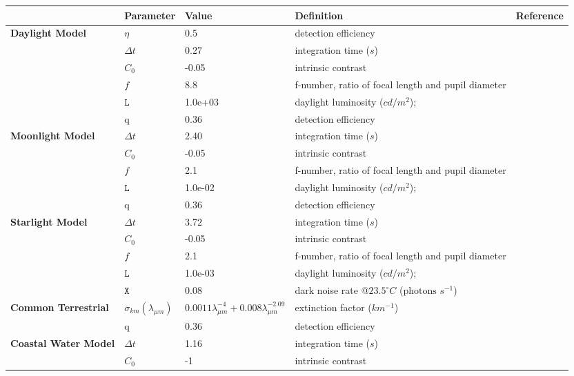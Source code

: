 \begin{tabular}{|L{3.5cm}|L{2.5cm}|L{2.5cm}|L{4.5cm}|L{4.5cm}|}
\hline
\textbf{ }&\textbf{Parameter}&\textbf{Value}&\textbf{Definition}&\textbf{Reference}\\\hline
\textbf{Daylight Model}&$\eta$&0.5&detection efficiency&\cite{Pirh07a}\\\hline
 &$\Delta t$&0.27&integration time ($s$)&\cite{Donn95a}\\\hline
 &$C_{0}$&-0.05&intrinsic contrast&\cite{Blac46a}\\\hline
 &$f$&8.8&f-number, ratio of focal length and pupil diameter&\cite{Mill79a}\\\hline
 &$\mathtt{L}$&1.0e+03&daylight luminosity ($cd/m^{2}$);&\cite{Midd52a}\\\hline
 &q&0.36&detection efficiency&\cite{Nils14a}\\\hline
\textbf{Moonlight Model}&$\Delta t$&2.40&integration time ($s$)&\cite{Donn95a}\\\hline
 &$C_{0}$&-0.05&intrinsic contrast&\cite{Blac46a}\\\hline
 &$f$&2.1&f-number, ratio of focal length and pupil diameter&\cite{Mill79a}\\\hline
 &$\mathtt{L}$&1.0e-02&daylight luminosity ($cd/m^{2}$);&\cite{Midd52a}\\\hline
 &q&0.36&detection efficiency&\cite{Nils14a}\\\hline
\textbf{Starlight Model}&$\Delta t$&3.72&integration time ($s$)&\cite{Donn95a}\\\hline
 &$C_{0}$&-0.05&intrinsic contrast&\cite{Blac46a}\\\hline
 &$f$&2.1&f-number, ratio of focal length and pupil diameter&\cite{Mill79a}\\\hline
 &$\mathtt{L}$&1.0e-03&daylight luminosity ($cd/m^{2}$);&\cite{Midd52a}\\\hline
 &$\mathtt{X}$&0.08&dark noise rate @$23.5^{\circ} C$ ($\text{photons } s^{-1}$)&\cite{Aho93a}\\\hline
\textbf{Common Terrestrial}&$\sigma_{km} (\lambda_{\mu m})$&$0.0011 \lambda_{\mu m}^{-4} + 0.008 \lambda_{\mu m}^{-2.09}$&extinction factor ($km^{-1}$)&\cite{Midd52a}\\\hline
 &q&0.36&detection efficiency&\cite{Nils14a}\\\hline
\textbf{Coastal Water Model}&$\Delta t$&1.16&integration time ($s$)&\cite{Donn95a}\\\hline
 &$C_{0}$&-1&intrinsic contrast&\cite{Nils14a}\\\hline

\end{tabular}
